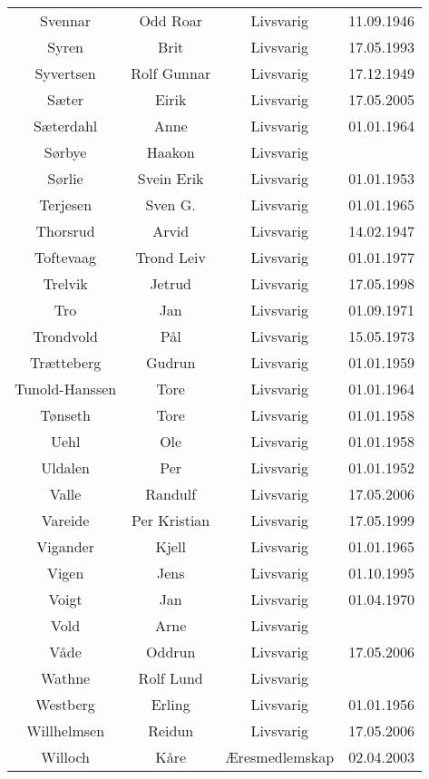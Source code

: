 \begin{tabular}{cccc}
        Svennar	&	Odd Roar	&	Livsvarig 	&	11.09.1946	\\
        Syren	&	Brit	&	Livsvarig 	&	17.05.1993	\\
        Syvertsen	&	Rolf Gunnar	&	Livsvarig 	&	17.12.1949	\\
        Sæter 	&	Eirik	&	Livsvarig	&	17.05.2005	\\
        Sæterdahl	&	Anne	&	Livsvarig 	&	01.01.1964	\\
        Sørbye	&	Haakon	&	Livsvarig 	&		\\
        Sørlie	&	Svein Erik	&	Livsvarig 	&	01.01.1953	\\
        Terjesen	&	Sven G.	&	Livsvarig 	&	01.01.1965	\\
        Thorsrud	&	Arvid	&	Livsvarig 	&	14.02.1947	\\
        Toftevaag	&	Trond Leiv	&	Livsvarig 	&	01.01.1977	\\
        Trelvik 	&	Jetrud	&	Livsvarig	&	17.05.1998	\\
        Tro	&	Jan	&	Livsvarig 	&	01.09.1971	\\
        Trondvold	&	Pål	&	Livsvarig 	&	15.05.1973	\\
        Trætteberg	&	Gudrun	&	Livsvarig 	&	01.01.1959	\\
        Tunold-Hanssen	&	Tore	&	Livsvarig 	&	01.01.1964	\\
        Tønseth	&	Tore	&	Livsvarig 	&	01.01.1958	\\
        Uehl	&	Ole	&	Livsvarig 	&	01.01.1958	\\
        Uldalen	&	Per	&	Livsvarig 	&	01.01.1952	\\
        Valle	&	Randulf	&	Livsvarig	&	17.05.2006	\\
        Vareide 	&	Per Kristian	&	Livsvarig	&	17.05.1999	\\
        Vigander	&	Kjell	&	Livsvarig 	&	01.01.1965	\\
        Vigen 	&	Jens	&	Livsvarig	&	01.10.1995	\\
        Voigt	&	Jan	&	Livsvarig 	&	01.04.1970	\\
        Vold	&	Arne	&	Livsvarig 	&		\\
        Våde	&	Oddrun	&	Livsvarig	&	17.05.2006	\\
        Wathne	&	Rolf Lund	&	Livsvarig 	&		\\
        Westberg	&	Erling	&	Livsvarig 	&	01.01.1956	\\
        Willhelmsen	&	Reidun	&	Livsvarig	&	17.05.2006	\\
        Willoch	&	Kåre	&	Æresmedlemskap	&	02.04.2003	\\

\end{tabular}
